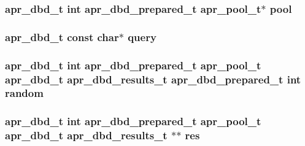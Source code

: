 \subsubsection[{\texorpdfstring{pool}{pool}}]{ {\bf apr\+\_\+dbd\+\_\+t} {\bf int} {\bf apr\+\_\+dbd\+\_\+prepared\+\_\+t} {\bf apr\+\_\+pool\+\_\+t}$\ast$ pool}\hypertarget{group__APR__Util__DBD_ga9069a943190f0778947265895c478883}{}\label{group__APR__Util__DBD_ga9069a943190f0778947265895c478883}
\subsubsection[{\texorpdfstring{query}{query}}]{ {\bf apr\+\_\+dbd\+\_\+t} const char$\ast$ query}\hypertarget{group__APR__Util__DBD_ga1086b66aba6ed16e6853a4cef784f8f6}{}\label{group__APR__Util__DBD_ga1086b66aba6ed16e6853a4cef784f8f6}
\subsubsection[{\texorpdfstring{random}{random}}]{ {\bf apr\+\_\+dbd\+\_\+t} {\bf int} {\bf apr\+\_\+dbd\+\_\+prepared\+\_\+t} {\bf apr\+\_\+pool\+\_\+t} {\bf apr\+\_\+dbd\+\_\+t} {\bf apr\+\_\+dbd\+\_\+results\+\_\+t} {\bf apr\+\_\+dbd\+\_\+prepared\+\_\+t} {\bf int} random}\hypertarget{group__APR__Util__DBD_gac93942ec5efab7a3d75b75e70c8c7a94}{}\label{group__APR__Util__DBD_gac93942ec5efab7a3d75b75e70c8c7a94}
\subsubsection[{\texorpdfstring{res}{res}}]{ {\bf apr\+\_\+dbd\+\_\+t} {\bf int} {\bf apr\+\_\+dbd\+\_\+prepared\+\_\+t} {\bf apr\+\_\+pool\+\_\+t} {\bf apr\+\_\+dbd\+\_\+t} {\bf apr\+\_\+dbd\+\_\+results\+\_\+t} $\ast$$\ast$ res}\hypertarget{group__APR__Util__DBD_ga3bb17d78322a086f98b82abd8bb9a8cd}{}\label{group__APR__Util__DBD_ga3bb17d78322a086f98b82abd8bb9a8cd}
